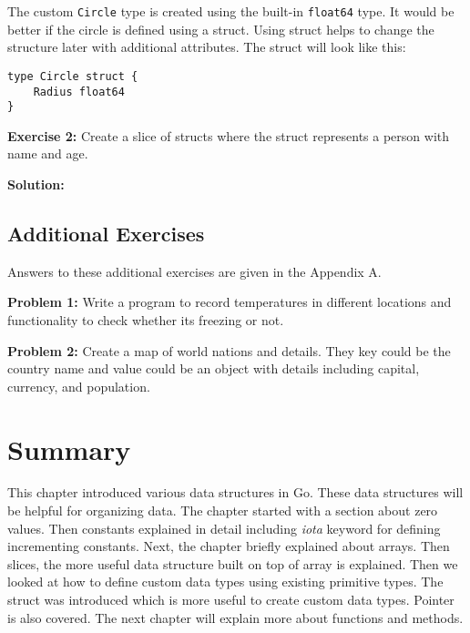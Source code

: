 

The custom \texttt{Circle} type is created using the
built-in \texttt{float64} type.  It would be better if the circle is
defined using a struct.  Using struct helps to change the structure
later with additional attributes.  The struct will look like this:

\begin{lstlisting}[numbers=none]
type Circle struct {
    Radius float64
}
\end{lstlisting}

\textbf{Exercise 2:} Create a slice of structs where the struct represents
a person with name and age.

\textbf{Solution:}



\subsection{Additional Exercises}

Answers to these additional exercises are given in the Appendix A.

\textbf{Problem 1:} Write a program to record temperatures
in different locations and functionality to check whether its freezing or not.

\textbf{Problem 2:} Create a map of world nations and details. They key could
be the country name and value could be an object with details including capital,
currency, and population.

\section*{Summary}

This chapter introduced various data structures in Go. These data structures
will be helpful for organizing data. The chapter started with a section about
zero values. Then constants explained in detail including \textit{iota} keyword
for defining incrementing constants. Next, the chapter briefly explained about
arrays. Then slices, the more useful data structure built on top of array is
explained. Then we looked at how to define custom data types using existing
primitive types. The struct was introduced which is more useful to create custom
data types. Pointer is also covered. The next chapter will explain more about
functions and methods.
